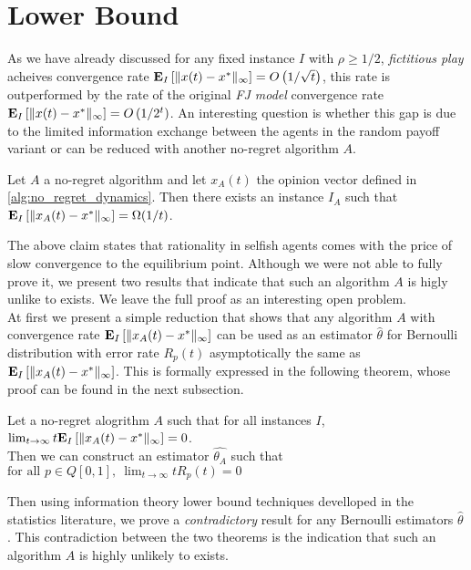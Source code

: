 \section{Lower Bound}
As we have already discussed for any fixed instance $I$ with $\rho\geq 1/2$, \emph{fictitious play} acheives convergence rate $\bm{\mathrm{E}}_{I} \left[ \| x(t)-x^* \|_{\infty} \right]=O\left(1/\sqrt{t}\right)$, this rate is outperformed by
the rate of the original \emph{FJ model} convergence rate $\bm{\mathrm{E}}_{I} \left[ \| x(t)-x^* \|_{\infty} \right]=O\left(1/2^{t}\right)$. An interesting question is whether this gap
is due to the limited information exchange between the agents in the random payoff variant or can be reduced with another no-regret algorithm $A$.

\begin{claim}\label{claim}
Let $A$ a no-regret algorithm and let $x_A(t)$ the opinion vector defined in \ref{alg:no_regret_dynamics}. Then there exists an instance $I_A$ such that $\bm{\mathrm{E}}_{I} \left[ \| x_A(t)-x^* \|_{\infty} \right] = \Omega(1/t)$.
\end{claim}

\noindent 
The above claim states that rationality in selfish agents comes with the price of slow convergence to the equilibrium point.
Although we were not able to fully prove it, we present two results that indicate that such an algorithm $A$ is higly unlike to exists. 
We leave the full proof as an interesting open problem.\\

At first we present a simple reduction that shows that any algorithm $A$ with convergence rate $\bm{\mathrm{E}}_{I} \left[ \| x_A(t)-x^* \|_{\infty} \right]$ can be used as
an estimator $\hat{\theta}$ for Bernoulli distribution with error rate $R_p(t)$ asymptotically the same as $\bm{\mathrm{E}}_{I} \left[ \| x_A(t)-x^* \|_{\infty} \right]$. This is formally
expressed in the following theorem, whose proof can be found in the next subsection.

\begin{theorem}\label{t:reduction}
Let a no-regret alogrithm $A$ such that for all instances $I$, $\lim_{t \rightarrow \infty} t\bm{\mathrm{E}}_{I} \left[ \| x_A(t)-x^* \|_{\infty} \right]=0$.\\
Then we can construct an estimator $\hat{\theta_A}$ such that $\text{for all }p \in Q[0,1],~  \lim_{t \rightarrow \infty}tR_p(t)=0$
\end{theorem}

\noindent Then using information theory lower bound techniques develloped in the statistics literature, we prove a \emph{contradictory} result for 
any Bernoulli estimators $\hat{\theta}$. This contradiction between the two theorems is the indication that such an algorithm $A$ is highly unlikely to exists.

